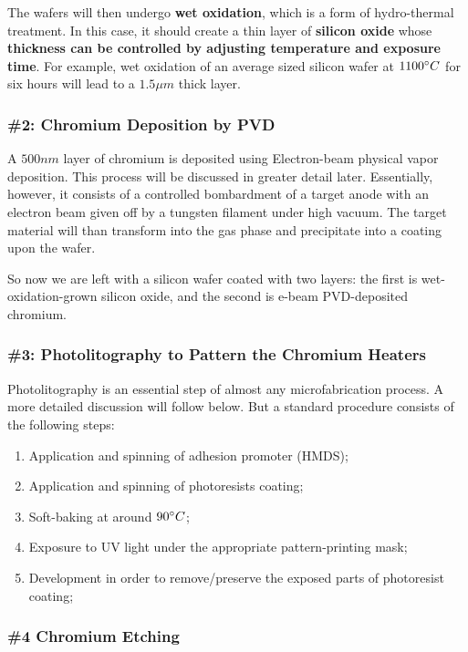 \documentclass[12pt,a4paper]{report}
\begin{document}
The wafers will then undergo \textbf{wet oxidation}, which is a form of hydro-thermal treatment. In this case, it should create a thin layer of \textbf{silicon oxide} whose \textbf{thickness can be controlled by adjusting temperature and exposure time}. For example, wet oxidation of an average sized silicon wafer at $1100\degree C$ for six hours will lead to a $1.5\mu m$ thick layer.

\subsubsection{\#2: Chromium Deposition by PVD}

A $500 nm$ layer of chromium is deposited using Electron-beam physical vapor deposition. This process will be discussed in greater detail later. Essentially, however, it consists of a controlled bombardment of a target anode with an electron beam given off by a tungsten filament under high vacuum. The target material will than transform into the gas phase and precipitate into a coating upon the wafer.

So now we are left with a silicon wafer coated with two layers: the first is wet-oxidation-grown silicon oxide, and the second is e-beam PVD-deposited chromium.

\subsubsection{\#3: Photolitography to Pattern the Chromium Heaters}

Photolitography is an essential step of almost any microfabrication process. A more detailed discussion will follow below. But a standard procedure consists of the following steps:

\begin{enumerate}
    \item Application and spinning of adhesion promoter (HMDS);
    \item Application and spinning of photoresists coating;
    \item Soft-baking at around $90\degree C$;
    \item Exposure to UV light under the appropriate pattern-printing mask;
    \item Development in order to remove/preserve the exposed parts of photoresist coating;
\end{enumerate}

\subsubsection{\#4 Chromium Etching}
\end{document}
